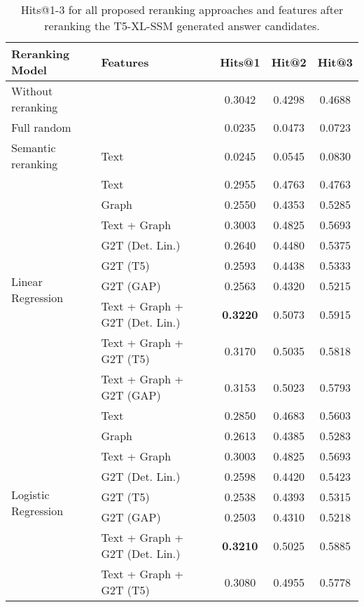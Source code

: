 \begin{table}[htbp]
    \setlength{\tabcolsep}{3pt}
    \caption{Hits@1-3 for all proposed reranking approaches and features after reranking the T5-XL-SSM generated answer candidates.}
    \label{tab:controllable_fusion:t5_xl_ssm_all_results}
    \fontsize{9pt}{11pt}\selectfont
    \centering
    \begin{tabular}{l p{5cm} c c c}
        \toprule
        \textbf{Reranking Model} & \textbf{Features} & \textbf{Hits@1} & \textbf{Hit@2} & \textbf{Hit@3} \\
        \midrule
        Without reranking & & 0.3042 & 0.4298 & 0.4688 \\
        \cmidrule(lr){1-5}
        Full random & & 0.0235 & 0.0473 & 0.0723 \\
        \cmidrule(lr){1-5}
        Semantic reranking & Text & 0.0245 & 0.0545 & 0.0830 \\
        \cmidrule(lr){1-5}
        \multirow{9}{*}{Linear Regression} & Text & 0.2955 & 0.4763 & 0.4763 \\
        & Graph & 0.2550 & 0.4353 & 0.5285 \\
        & Text + Graph & 0.3003 & 0.4825 & 0.5693 \\
        & G2T (Det. Lin.) & 0.2640 & 0.4480 & 0.5375 \\
        & G2T (T5) & 0.2593 & 0.4438 & 0.5333 \\
        & G2T (GAP) & 0.2563 & 0.4320 & 0.5215 \\
        & Text + Graph + G2T (Det. Lin.) & \textbf{0.3220} & 0.5073 & 0.5915 \\
        & Text + Graph + G2T (T5) & 0.3170 & 0.5035 & 0.5818 \\
        & Text + Graph + G2T (GAP) & 0.3153 & 0.5023 & 0.5793 \\
        \midrule
        \multirow{12}{*}{Logistic Regression} & Text & 0.2850 & 0.4683 & 0.5603 \\
        & Graph & 0.2613 & 0.4385 & 0.5283 \\
        & Text + Graph & 0.3003 & 0.4825 & 0.5693 \\
        & G2T (Det. Lin.) & 0.2598 & 0.4420 & 0.5423 \\
        & G2T (T5) & 0.2538 & 0.4393 & 0.5315 \\
        & G2T (GAP) & 0.2503 & 0.4310 & 0.5218 \\
        & Text + Graph + G2T (Det. Lin.) & \textbf{0.3210} & 0.5025 & 0.5885 \\
        & Text + Graph + G2T (T5) & 0.3080 & 0.4955 & 0.5778 \\

\end{tabular}
\end{table}
